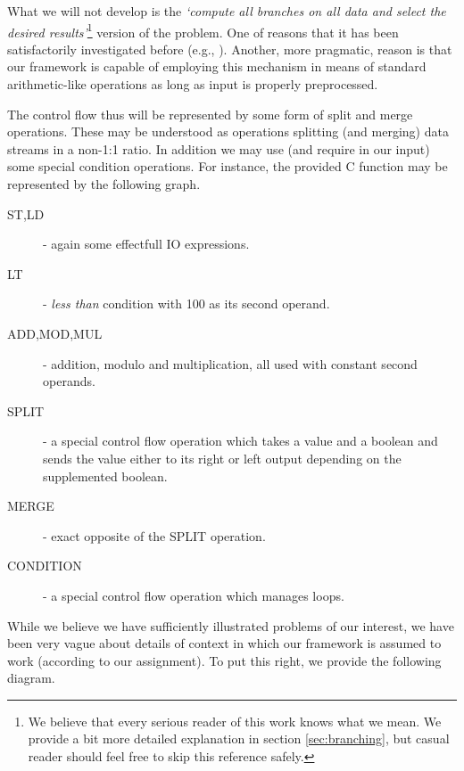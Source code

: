 \begin{rem}
  What we will not develop is the \emph{`compute all branches on all data and select the desired results'}\footnote{We believe that every serious reader of this work knows what we mean. We provide a bit more detailed explanation in section \ref{sec:branching}, but casual reader should feel free to skip this reference safely.} version of the problem. One of reasons that it has been satisfactorily investigated before (e.g., \cite{who_knows}). Another, more pragmatic, reason is that our framework is capable of employing this mechanism in means of standard arithmetic-like operations as long as input is properly preprocessed.
\end{rem}


The control flow thus will be represented by some form of split and merge operations. These may be understood as operations splitting (and merging) data streams in a non-1:1 ratio. In addition we may use (and require in our input) some special condition operations. For instance, the provided C function may be represented by the following graph.


\begin{description}
  \item[ST,LD] - again some effectfull IO expressions.
  \item[LT] - \emph{less than} condition with 100 as its second operand.
  \item[ADD,MOD,MUL] - addition, modulo and multiplication, all used with constant second operands.
  \item[SPLIT] - a special control flow operation which takes a value and a boolean and sends the value either to its right or left output depending on the supplemented boolean.
  \item[MERGE] - exact opposite of the SPLIT operation.
  \item[CONDITION] - a special control flow operation which manages loops. 
\end{description}

  While we believe we have sufficiently illustrated problems of our interest, we have been very vague about details of context in which our framework is assumed to work (according to our assignment). To put this right, we provide the following diagram.


